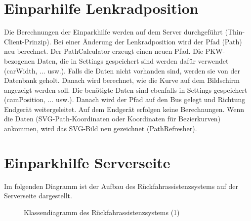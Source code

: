 \documentclass[entwurf.tex]{subfiles}
\begin{document}
		\section{Einparhilfe Lenkradposition}
Die Berechnungen der Einparkhilfe werden auf dem Server durchgeführt (Thin-Client-Prinzip). Bei einer Änderung der Lenkradposition wird der Pfad (Path) neu berechnet. Der PathCalculator erzeugt einen neuen Pfad. Die PKW-bezogenen Daten, die in Settings gespeichert sind werden dafür verwendet (carWidth, ... usw.). Falls die Daten nicht vorhanden sind, werden sie von der Datenbank geholt. Danach wird berechnet, wie die Kurve auf dem Bildschirm angezeigt werden soll. Die benötigte Daten sind ebenfalls in Settings gespeichert (camPosition, ... usw.). Danach wird der Pfad auf den Bus gelegt und Richtung Endgerät weitergeleitet. Auf dem Endgerät erfolgen keine Berechnungen. Wenn die Daten (SVG-Path-Koordinaten oder Koordinaten für Bezierkurven) ankommen, wird das SVG-Bild neu gezeichnet (PathRefresher).
  	
		\newpage
  	\section{Einparkhilfe Serverseite}
		Im folgenden Diagramm ist der Aufbau des Rückfahrassistenzsystems auf der Serverseite dargestellt.
		\begin{figure}[H]
  			\caption{Klassendiagramm des Rückfahrassistenzsystems (1)}
  		\end{figure}
  		
  	\newpage
\end{document}
